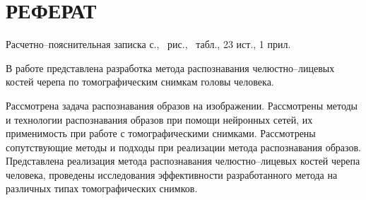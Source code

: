 \section*{РЕФЕРАТ}

Расчетно--пояснительная записка \pageref{LastPage} с., \totalfigures\ рис., \totaltables\ табл., 23 ист., 1 прил.

В работе представлена разработка метода распознавания челюстно--лицевых костей черепа по томографическим снимкам головы человека.

Рассмотрена задача распознавания образов на изображении. Рассмотрены методы и технологии распознавания образов при помощи нейронных сетей, их применимость при работе с томографическими снимками. Рассмотрены сопутствующие методы и подходы при реализации метода распознавания образов. Представлена реализация метода распознавания челюстно--лицевых костей черепа человека, проведены исследования эффективности разработанного метода на различных типах томографических снимков.